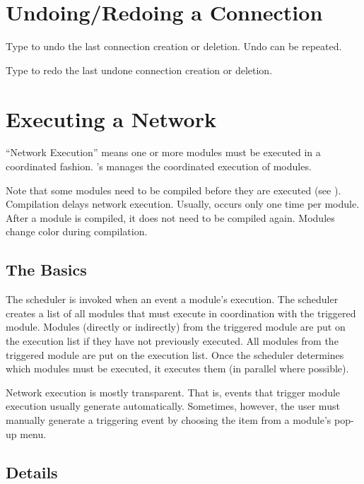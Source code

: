 \section{Undoing/Redoing a Connection}
\label{sec:undomod}

Type  to undo the last connection creation or deletion.
Undo can be repeated.

Type  to redo the last undone connection creation or
deletion.

\section{Executing a Network}
\label{sec:executenet}

``Network Execution'' means one or more modules must be executed in a
coordinated fashion. 
\sr{}'s  manages the coordinated execution of modules.

Note that some modules need to be compiled before they are
executed (see ).  Compilation
delays network execution.  Usually, occurs only one time
per module.  After a module is compiled, it does not need to be
compiled again.  Modules change color during compilation.

\subsection{The Basics}

The scheduler is invoked when an event  a
module's execution.  The scheduler creates a list of all modules that
must execute in coordination with the triggered module. Modules
 (directly or indirectly) from the triggered module are 
put on the execution list if they have not previously executed.
All modules  from the triggered module are put
on the execution list.  Once the scheduler determines which modules must be
executed, it executes them (in parallel where possible).

Network execution is mostly transparent.  That is, events that trigger
module execution usually generate automatically. Sometimes,
however, the user must manually
generate a triggering event by choosing the  item from a
module's pop-up menu.

\subsection{Details}

